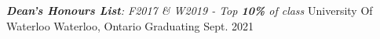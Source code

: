 \begin{siderulesEdu}
\begin{cventries}
  \cventry
    {\emph{\color{black}{Candidate of B.ASc: Honours Mechanical Engineering}  \break\textbf{Dean's Honours List}: F2017 \& W2019 - \textit{Top \textbf{10\%} of class}}}
    {University Of Waterloo}
    {Waterloo, Ontario}
    {Graduating Sept. 2021}
    {}
\end{cventries}
\end{siderulesEdu}
